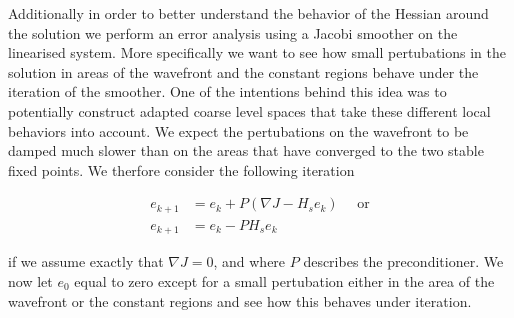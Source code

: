 \documentclass[../draft_1.tex]{subfiles}
\begin{document}
Additionally in order to better understand the behavior of the Hessian around the solution we perform an error analysis using a Jacobi smoother on the linearised system. More specifically we want to see how small pertubations in the solution in areas of the wavefront and the constant regions behave under the iteration of the smoother. One of the intentions behind this idea was to potentially construct adapted coarse level spaces that take these different local behaviors into account. We expect the pertubations on the wavefront to be damped much slower than on the areas that have converged to the two stable fixed points. We therfore consider the following iteration 
\begin{ceqn}
	\begin{equation}
	\begin{aligned}
e_{k+1} &= e_k + P(\nabla J - H_s e_k) \quad \text{ or} \\
e_{k+1} &= e_k - P H_s e_k 
	\end{aligned}
	\end{equation}
\end{ceqn}
if we assume exactly that $\nabla J = 0$, and where $P$ describes the preconditioner. We now let $e_0$ equal to zero except for a small pertubation either in the area of the wavefront or the constant regions and see how this behaves under iteration.
\end{document}
